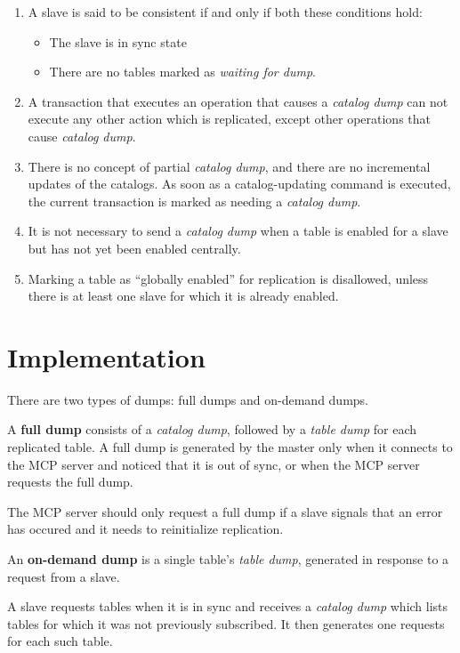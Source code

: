 \documentclass{article}
\newcommand{\catdump}{\emph{catalog dump}}
\newcommand{\tabdump}{\emph{table dump}}
\begin{document}
\begin{enumerate}

\item A slave is said to be consistent
if and only if both these conditions hold:
\begin{itemize}
 \item The slave is in sync state
 \item There are no tables marked as \emph{waiting for dump}.
\end{itemize}

\item A transaction
that executes an operation that causes a \catdump{}
can not execute any other action which is replicated,
except other operations that cause \catdump.

\item There is no concept of partial \catdump,
and there are no incremental updates of the catalogs.
As soon as a catalog-updating command is executed,
the current transaction is marked as needing a \catdump.

\item It is not necessary to send a \catdump{} when 
a table is enabled for a slave
but has not yet been enabled centrally.

\item Marking a table as ``globally enabled'' for replication
is disallowed,
unless there is at least one slave
for which it is already enabled.

\end{enumerate}

\section{Implementation}

There are two types of dumps: full dumps and on-demand dumps.

A {\bf full dump} consists of a \catdump,
followed by a \tabdump{} for each replicated table.
A full dump is generated by the master
only when it connects to the MCP server
and noticed that it is out of sync,
or when the MCP server requests the full dump.

The MCP server should only request a full dump
if a slave signals that an error has occured and
it needs to reinitialize replication.

An {\bf on-demand dump} is a single table's \tabdump,
generated in response to a request from a slave.

A slave requests tables when it is in sync
and receives a \catdump{} which lists tables
for which it was not previously subscribed.
It then generates one requests for each such table.
\end{document}
